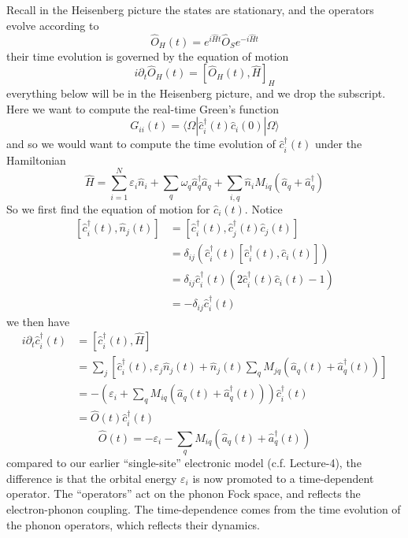 Recall in the Heisenberg picture the states are stationary, and the operators evolve according to
\[ \hat{O}_H\left( t \right) =e^{i\hat{H}t}\hat{O}_Se^{-i\hat{H}t}\]
their time evolution is governed by the equation of motion
\[ i\partial _t\hat{O}_H\left( t \right) =\left[ \hat{O}_H\left( t \right) ,\hat{H} \right] _H\]
everything below will be in the Heisenberg picture, and we drop the subscript. Here we want to compute the real-time Green's function
\[G_{ii}\left( t \right) =\langle \Omega |\hat{c}_{i}^{\dagger}\left( t \right) \hat{c}_i\left( 0 \right) |\Omega \rangle \]
and so we would want to compute the time evolution of $\hat{c}_i^\dagger(t)$ under the Hamiltonian
\[ \hat{H}=\sum_{i=1}^N{\varepsilon _i\hat{n}_i}+\sum_q{\omega _q\hat{a}_{q}^{\dagger}\hat{a}_q}+\sum_{i,q}{\hat{n}_iM_{iq}\left( \hat{a}_q+\hat{a}_{q}^{\dagger} \right)}\]
So we first find the equation of motion for $\hat{c}_i(t)$. Notice
\begin{align*}
    \left[ \hat{c}_{i}^{\dagger}\left( t \right) ,\hat{n}_j\left( t \right) \right] &=\left[ \hat{c}_{i}^{\dagger}\left( t \right) ,\hat{c}_{j}^{\dagger}\left( t \right) \hat{c}_j\left( t \right) \right] \\
    &=\delta _{ij}\left( \hat{c}_{i}^{\dagger}\left( t \right) \left[ \hat{c}_{i}^{\dagger}\left( t \right) ,\hat{c}_i\left( t \right) \right] \right) \\
    &=\delta _{ij}\hat{c}_{i}^{\dagger}\left( t \right) \left( 2\hat{c}_{i}^{\dagger}\left( t \right) \hat{c}_i\left( t \right) -1 \right) \\
    &=-\delta _{ij}\hat{c}_{i}^{\dagger}\left( t \right)
\end{align*}
we then have
\begin{align*}
    i\partial _t\hat{c}_{i}^{\dagger}\left( t \right) &=\left[ \hat{c}_{i}^{\dagger}\left( t \right) ,\hat{H} \right] \\
    &=\sum_j{\left[ \hat{c}_{i}^{\dagger}\left( t \right) ,\varepsilon _j\hat{n}_j\left( t \right) +\hat{n}_j\left( t \right) \sum_q{M_{jq}\left( \hat{a}_q\left( t \right) +\hat{a}_{q}^{\dagger}\left( t \right) \right)} \right]}\\
    &=-\left( \varepsilon _i+\sum_q{M_{iq}\left( \hat{a}_q\left( t \right) +\hat{a}_{q}^{\dagger}\left( t \right) \right)} \right) \hat{c}_{i}^{\dagger}\left( t \right) \\
    &=\hat{O}\left( t \right) \hat{c}_{i}^{\dagger}\left( t \right)
\end{align*}
\[ \hat{O}\left( t \right) =-\varepsilon _i-\sum_q{M_{iq}\left( \hat{a}_q\left( t \right) +\hat{a}_{q}^{\dagger}\left( t \right) \right)}\]
compared to our earlier ``single-site'' electronic model (c.f. Lecture-4), the difference is that the orbital energy $\varepsilon_i$ is now promoted to a time-dependent operator. The ``operators'' act on the phonon Fock space, and reflects the electron-phonon coupling. The time-dependence comes from the time evolution of the phonon operators, which reflects their dynamics.

